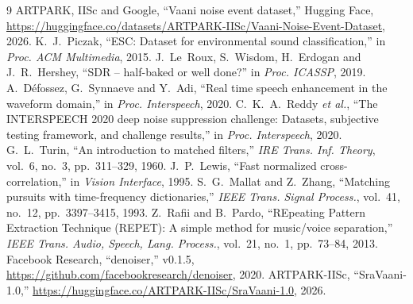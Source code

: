 \documentclass[conference]{IEEEtran}
\begin{document}
\begin{thebibliography}{9}
 ARTPARK, IISc and Google, ``Vaani noise event dataset,'' Hugging Face,
\url{https://huggingface.co/datasets/ARTPARK-IISc/Vaani-Noise-Event-Dataset}, 2026.
 K.~J.~Piczak, ``ESC: Dataset for environmental sound classification,'' in \emph{Proc. ACM
Multimedia}, 2015.
 J.~Le~Roux, S.~Wisdom, H.~Erdogan and J.~R.~Hershey, ``SDR -- half-baked or well done?'' in
\emph{Proc. ICASSP}, 2019.
 A.~D\'efossez, G.~Synnaeve and Y.~Adi, ``Real time speech enhancement in the waveform domain,'' in
\emph{Proc. Interspeech}, 2020.
 C.~K.~A.~Reddy \emph{et al.}, ``The INTERSPEECH 2020 deep noise suppression challenge: Datasets,
subjective testing framework, and challenge results,'' in \emph{Proc. Interspeech}, 2020.
 G.~L.~Turin, ``An introduction to matched filters,'' \emph{IRE Trans. Inf. Theory}, vol.~6, no.~3,
pp.~311--329, 1960.
 J.~P.~Lewis, ``Fast normalized cross-correlation,'' in \emph{Vision Interface}, 1995.
 S.~G.~Mallat and Z.~Zhang, ``Matching pursuits with time-frequency dictionaries,'' \emph{IEEE
Trans. Signal Process.}, vol.~41, no.~12, pp.~3397--3415, 1993.
 Z.~Rafii and B.~Pardo, ``REpeating Pattern Extraction Technique (REPET): A simple method for
music/voice separation,'' \emph{IEEE Trans. Audio, Speech, Lang. Process.}, vol.~21, no.~1, pp.~73--84, 2013.
 Facebook Research, ``denoiser,'' v0.1.5, \url{https://github.com/facebookresearch/denoiser},
2020.
 ARTPARK-IISc, ``SraVaani-1.0,'' \url{https://huggingface.co/ARTPARK-IISc/SraVaani-1.0}, 2026.
\end{thebibliography}
\end{document}
